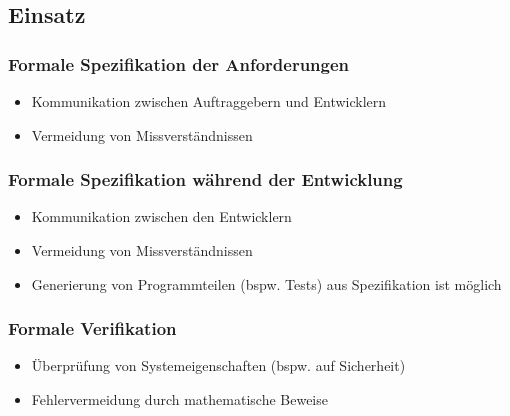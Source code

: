 	    \subsection{Einsatz}
		    \subsubsection{Formale Spezifikation der Anforderungen}
			    \begin{itemize}
			    	\item Kommunikation zwischen Auftraggebern und Entwicklern
			    	\item Vermeidung von Missverständnissen
			    \end{itemize}
		    
		    \subsubsection{Formale Spezifikation während der Entwicklung}
			    \begin{itemize}
			    	\item Kommunikation zwischen den Entwicklern
			    	\item Vermeidung von Missverständnissen
			    	\item Generierung von Programmteilen (bspw. Tests) aus Spezifikation ist möglich
			    \end{itemize}
		    
		    \subsubsection{Formale Verifikation}
			    \begin{itemize}
			    	\item Überprüfung von Systemeigenschaften (bspw. auf Sicherheit)
			    	\item Fehlervermeidung durch mathematische Beweise
			    \end{itemize}
    
